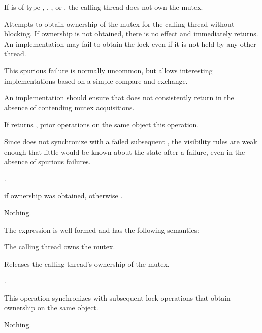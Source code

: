 \begin{itemdescr}
\pnum
\expects
If  is of type , ,
, or , the calling
thread does not own the mutex.

\pnum
\effects
Attempts to obtain ownership of the mutex for the calling thread without
blocking. If ownership is not obtained, there is no effect and 
immediately returns. An implementation may fail to obtain the lock even if it is not
held by any other thread.
\begin{note}
This spurious failure is normally uncommon, but
allows interesting implementations based on a simple
compare and exchange.
\end{note}
An implementation should ensure that  does not consistently return 
in the absence of contending mutex acquisitions.

\pnum
\sync
If  returns , prior  operations
on the same object  this operation.
\begin{note}
Since  does not synchronize with a failed subsequent
, the visibility rules are weak enough that little would be
known about the state after a failure, even in the absence of spurious failures.
\end{note}

\pnum
\returntype {}.

\pnum
\returns
{} if ownership was obtained, otherwise .

\pnum
\throws
Nothing.
\end{itemdescr}

\pnum
The expression  is well-formed and has the following semantics:

\begin{itemdescr}
\pnum
\expects
The calling thread owns the mutex.

\pnum
\effects
Releases the calling thread's ownership of the mutex.

\pnum
\returntype {}.

\pnum
\sync
This operation synchronizes with subsequent
lock operations that obtain ownership on the same object.

\pnum
\throws
Nothing.
\end{itemdescr}

